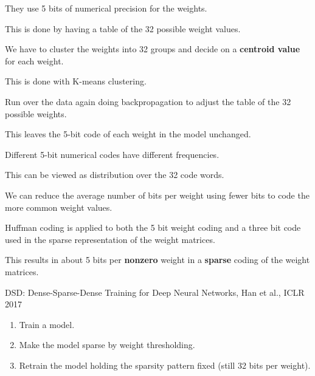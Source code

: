 {

They use 5 bits of numerical precision for the weights.

\vfill
This is done by having a table of the 32 possible weight values.

\vfill
We have to cluster the weights into 32 groups and decide on a {\bf centroid value} for each weight.

\vfill
This is done with K-means clustering.



Run over the data again doing backpropagation to adjust the table of the 32 possible weights.

\vfill
This leaves the 5-bit code of each weight in the model unchanged.


Different 5-bit numerical codes have different frequencies.

\vfill
This can be viewed as distribution over the 32 code words.

\vfill
We can reduce the average number of bits per weight using fewer bits to code the more common weight values.

\vfill
Huffman coding is applied to both the 5 bit weight coding and a three bit code used in the sparse representation of the weight matrices.

\vfill
This results in about 5 bits  per {\bf nonzero} weight in a {\bf sparse} coding of the weight matrices.


DSD: Dense-Sparse-Dense Training for Deep
Neural Networks, Han et al., ICLR 2017

\vfill
\begin{enumerate}
\item Train a model.

  \vfill
\item Make the model sparse by weight thresholding.

  \vfill
\item Retrain the model holding the sparsity pattern fixed (still 32 bits per weight).


\end{enumerate}}
